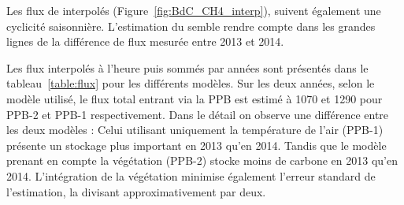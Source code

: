 Les flux de \chh interpolés (Figure~\ref{fig:BdC_CH4_interp}), suivent également une cyclicité saisonnière.
L'estimation du \chh semble rendre compte dans les grandes lignes de la différence de flux mesurée entre 2013 et 2014.





Les flux interpolés à l'heure puis sommés par années sont présentés dans le tableau~\ref{table:flux} pour les différents modèles.
Sur les deux années, selon le modèle utilisé, le flux total entrant via la PPB est estimé à 1070 et \SI{1290}{\gcma} pour PPB-2 et PPB-1 respectivement.
Dans le détail on observe une différence entre les deux modèles : 
Celui utilisant uniquement la température de l'air (PPB-1) présente un stockage plus important en 2013 qu'en 2014.
Tandis que le modèle prenant en compte la végétation (PPB-2) stocke moins de carbone en 2013 qu'en 2014.
L'intégration de la végétation minimise également l'erreur standard de l'estimation, la divisant approximativement par deux.

